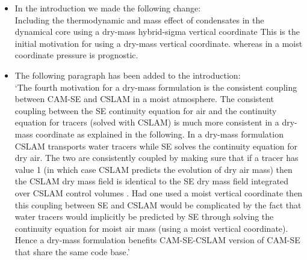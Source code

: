 \documentclass[11pt]{article}
\begin{document}
\begin{itemize}
\item In the introduction we made the following change:\\

Including the thermodynamic and mass effect of condensates in the dynamical core using a dry-mass hybrid-sigma vertical coordinate {\color{red}{is mathematically simpler due to the clear separation of dry air, water vapor and condensates in the discretization.}} This is the initial motivation for using a dry-mass vertical coordinate. {\color{red}{That said, certain parts of the implementation of a dry-mass coordinate in the dynamical core is slightly more complicated since moist pressure is a diagnostic in a dry-mass vertical coordinate formulation  (mass effects of moisture and condensates need to be explicitly added)} whereas in a moist coordinate pressure is prognostic.}
\item The following paragraph has been added to the introduction:\\

`The fourth motivation for a dry-mass formulation is the consistent coupling between CAM-SE and CSLAM \cite[Conservative Semi-LAgrangian Multi-tracer scheme][]{LNU2010JCP} in a moist atmosphere. The consistent coupling between the SE continuity equation for air and the continuity equation for tracers (solved with CSLAM) is much more consistent in a dry-mass coordinate as explained in the following. In a dry-mass formulation CSLAM transports water tracers while SE solves the continuity equation for dry air. The two are consistently coupled by making sure that if a tracer has value 1 (in which case CSLAM predicts the evolution of dry air mass) then the CSLAM dry mass field is identical to the SE dry mass field integrated over CSLAM control volumes \citep[how this is done is explained in detail in ][]{LTOUNGK2017MWR}. Had one used a moist vertical coordinate then this coupling between SE and CSLAM would be complicated by the fact that water tracers would implicitly be predicted by SE through solving the continuity equation for moist air mass (using a moist vertical coordinate). Hence a dry-mass formulation benefits CAM-SE-CSLAM version of CAM-SE that share the same code base.'
\end{itemize}

{\color{blue}{
Other than the moist-mass effects, have there been any fundamental improvements to the discretization in CAM-SE? Some of the changes demonstrated in the paper are just re-configuration of runtime parameters. Figure 6 shows a major change in the kinetic energy spectrum, but this should be simply due to the new choice of parameters, and doesn't seem to be due to fundamental improvements in the solver. }}\\
\end{document}

